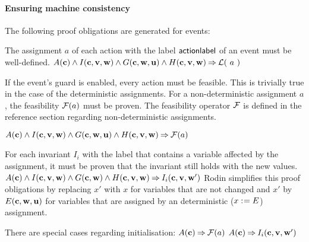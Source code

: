 \paragraph{Ensuring machine consistency}
\label{consistency_proof_obligations}
The following proof obligations are generated for events:

The assignment $a$ of each action with the label $\textsf{actionlabel}$ of an event must be well-defined.
  {}%
  {$A(\mathbf{c}) \land I(\mathbf{c},{\mathbf{v},\mathbf{w}}) \land G(\mathbf{c},\mathbf{w},\mathbf{u})
    \land H(\mathbf{c},{\mathbf{v},\mathbf{w}}) \mathbin\Rightarrow \mathcal{L}(~a~)$}
  
If the event's guard is enabled, every action must be feasible.
  This is trivially true in the case of the deterministic assignments.
  For a non-deterministic assignment $a$, the feasibility $\mathcal{F}(a)$ must be proven.
  The feasibility operator $\mathcal{F}$ is defined in the reference
  section regarding non-deterministic assignments.
  
  {$A(\mathbf{c}) \land I(\mathbf{c},{\mathbf{v},\mathbf{w}}) \land G(\mathbf{c},\mathbf{w},\mathbf{u})
    \land H(\mathbf{c},{\mathbf{v},\mathbf{w}}) \mathbin\Rightarrow \mathcal{F}(a)$}

For each invariant $I_i$ with the label  
  that contains a variable affected by the assignment, it must be proven
  that the invariant still holds with the new values.
  {}%
  {$A(\mathbf{c}) \land I(\mathbf{c},{\mathbf{v},\mathbf{w}}) \land G(\mathbf{c},\mathbf{w}) 
    \land H(\mathbf{c},{\mathbf{v},\mathbf{w}}) \mathbin\Rightarrow I_i(\mathbf{c},{\mathbf{v},\mathbf{w}}')$}
  Rodin simplifies this proof obligations by replacing $x'$ with $x$ for variables that are not
  changed and $x'$ by $E(\mathbf{c},\mathbf{w},\mathbf{u})$ 
  for variables that are assigned by an deterministic ($x \mathrel{:\mkern1mu=} E$) assignment.

There are special cases regarding initialisation:
  {$A(\mathbf{c}) \mathbin\Rightarrow  \mathcal{F}(a)$}
  {}%
  {$A(\mathbf{c}) \mathbin\Rightarrow I_i(\mathbf{c},{\mathbf{v},\mathbf{w}}')$}

